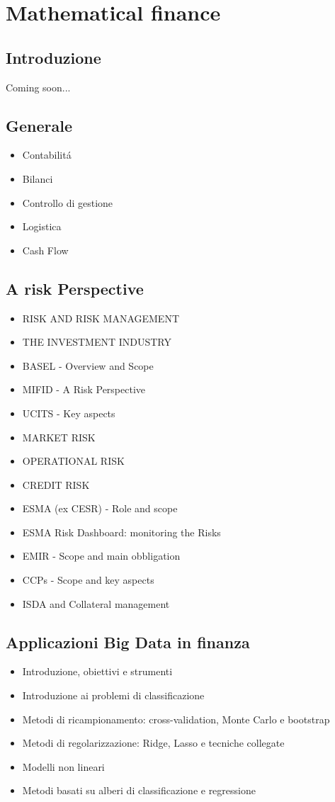 \chapter{Mathematical finance}


\section{Introduzione}
Coming soon...

\section{Generale}
\begin{itemize}
	\item Contabilit\'{a}
	\item Bilanci
	\item Controllo di gestione
	\item Logistica
	\item Cash Flow
\end{itemize}

\section{A risk Perspective}
\begin{itemize}
	\item RISK AND RISK MANAGEMENT
	\item THE INVESTMENT INDUSTRY
	\item BASEL - Overview and Scope
	\item MIFID - A Risk Perspective
	\item UCITS - Key aspects
	\item MARKET RISK
	\item OPERATIONAL RISK
	\item CREDIT RISK
	\item ESMA (ex CESR) - Role and scope
	\item ESMA Risk Dashboard: monitoring the Risks
	\item EMIR - Scope and main obbligation
	\item CCPs - Scope and key aspects
	\item ISDA and Collateral management
\end{itemize}

\section{Applicazioni Big Data in finanza}
\begin{itemize}
	\item Introduzione, obiettivi e strumenti
	\item Introduzione ai problemi di classificazione
	\item Metodi di ricampionamento: cross-validation, Monte Carlo e bootstrap
	\item Metodi di regolarizzazione: Ridge, Lasso e tecniche collegate
	\item Modelli non lineari
	\item Metodi basati su alberi di classificazione e regressione
\end{itemize}

